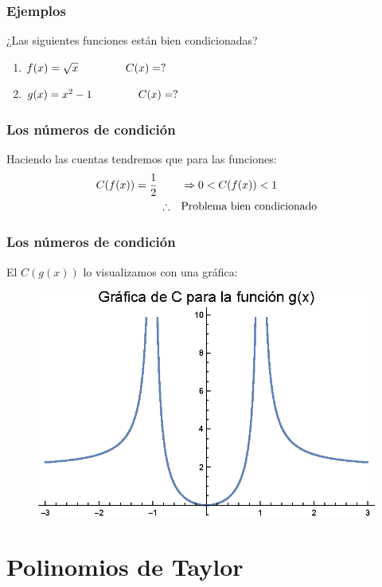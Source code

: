 \documentclass[12pt]{beamer}
\begin{document}
\begin{frame}
\frametitle{Ejemplos}
¿Las siguientes funciones están bien condicionadas?
\pause
{}
\begin{enumerate}[<+->]
\item $f (x) = \sqrt{x} \hspace{1.5cm} C (x) = ?$
\item $g (x) = x^{2} - 1 \hspace{1.5cm} C (x) = ?$
\end{enumerate}
\end{frame}
\begin{frame}
\frametitle{Los números de condición}
Haciendo las cuentas tendremos que para las funciones:
\pause
\begin{align*}
C (f (x) ) = \dfrac{1}{2} \hspace{0.75cm} &\Rightarrow 0 < C (f (x) ) < 1 \\
\therefore \quad &\text{Problema bien condicionado}
\end{align*}
\end{frame}
\begin{frame}
\frametitle{Los números de condición}
El $C (g (x) )$ lo visualizamos con una gráfica:
\pause
\begin{figure}
	\centering
	\includegraphics[scale=0.85]{Imagenes/Condicion_02.eps}
\end{figure}
\end{frame}

\section{Polinomios de Taylor}
\end{document}
